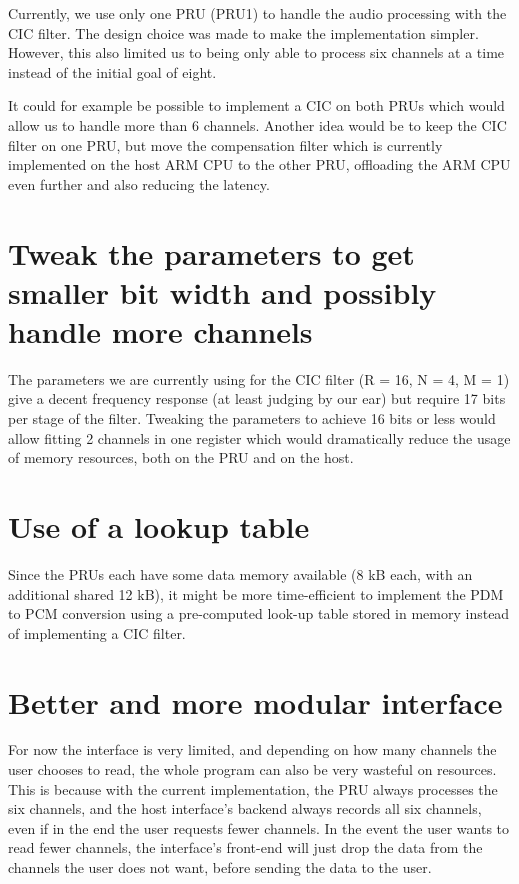 \documentclass[]{report}
\begin{document}
Currently, we use only one PRU (PRU1) to handle the audio processing with the CIC filter. The design choice was made to make the implementation simpler. However, this also limited us to being only able to process six channels at a time instead of the initial goal of eight.

It could for example be possible to implement a CIC on both PRUs which would allow us to handle more than 6 channels. Another idea would be to keep the CIC filter on one PRU, but move the compensation filter which is currently implemented on the host ARM CPU to the other PRU, offloading the ARM CPU even further and also reducing the latency.

\hypertarget{tweak-the-parameters-to-get-smaller-bit-width-and-possibly-handle-more-channels}{%
\section{Tweak the parameters to get smaller bit width and possibly
handle more
channels}\label{tweak-the-parameters-to-get-smaller-bit-width-and-possibly-handle-more-channels}}

The parameters we are currently using for the CIC filter (R = 16, N = 4, M = 1) give a decent frequency response (at least judging by our ear) but require 17 bits per stage of the filter. Tweaking the parameters to achieve 16 bits or less would allow fitting 2 channels in one register which would dramatically reduce the usage of memory resources, both on the PRU and on the host.


\hypertarget{use-of-a-lookup-table}{%
\section{Use of a lookup table}\label{use-of-a-lookup-table}}

Since the PRUs each have some data memory available (8 kB each, with an additional shared 12 kB), it might be more time-efficient to implement the PDM to PCM conversion using a pre-computed look-up table stored in memory instead of implementing a CIC filter.

\hypertarget{better-and-more-modular-interface}{%
\section{Better and more modular
interface}\label{better-and-more-modular-interface}}

For now the interface is very limited, and depending on how many channels the user chooses to read, the whole program can also be very wasteful on resources. This is because with the current implementation, the PRU always processes the six channels, and the host interface's backend always records all six channels, even if in the end the user requests fewer channels. In the event the user wants to read fewer channels, the interface's front-end will just drop the data from the channels the user does not want, before sending the data to the user.
\end{document}
